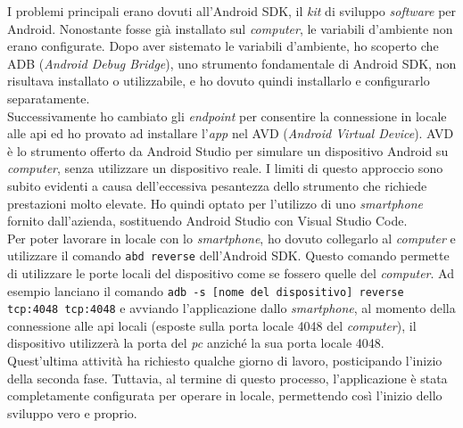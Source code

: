 I problemi principali erano dovuti all'Android SDK, il \textit{kit} di sviluppo \textit{software} per Android. Nonostante fosse 
già installato sul \textit{computer}, le variabili d'ambiente non erano configurate. Dopo aver sistemato le variabili 
d'ambiente, ho scoperto che ADB (\textit{Android Debug Bridge}), uno strumento fondamentale di Android SDK, non risultava 
installato o utilizzabile, e ho dovuto quindi installarlo e configurarlo separatamente.\\
Successivamente ho cambiato gli \textit{endpoint} per consentire la connessione in locale alle \gls{api} ed ho provato ad installare 
l'\textit{app} nel AVD (\textit{Android Virtual Device}). AVD è lo strumento offerto da Android Studio per simulare un dispositivo 
Android su \textit{computer}, senza utilizzare un dispositivo reale. I limiti di questo approccio sono subito evidenti a 
causa dell'eccessiva pesantezza dello strumento che richiede prestazioni molto elevate. 
Ho quindi optato per l'utilizzo di uno \textit{smartphone} fornito dall'azienda, sostituendo Android Studio con Visual Studio Code.\\
Per poter lavorare in locale con lo \textit{smartphone}, ho dovuto collegarlo al \textit{computer} e utilizzare il comando 
\texttt{abd reverse} dell'Android SDK. Questo comando permette di utilizzare le porte locali del dispositivo come se fossero quelle 
del \textit{computer}. Ad esempio lanciano il comando \texttt{adb -s [nome del dispositivo] reverse tcp:4048 tcp:4048} e 
avviando l'applicazione dallo \textit{smartphone}, al momento della connessione alle \gls{api} locali (esposte sulla porta 
locale 4048 del \textit{computer}), il dispositivo utilizzerà la porta del \textit{pc} anziché la sua porta 
locale 4048.\\
Quest'ultima attività ha richiesto qualche giorno di lavoro, posticipando l'inizio della seconda fase.
Tuttavia, al termine di questo processo, l'applicazione è stata completamente configurata per operare in locale, 
permettendo così l'inizio dello sviluppo vero e proprio.


